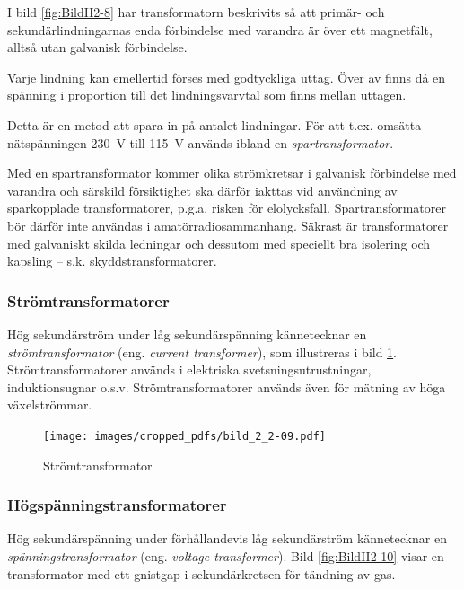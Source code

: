 I bild \ref{fig:BildII2-8} har transformatorn beskrivits så att primär- och
sekundärlindningarnas enda förbindelse med varandra är över ett magnetfält,
alltså utan galvanisk förbindelse.

Varje lindning kan emellertid förses med godtyckliga uttag. Över av finns då en
spänning i proportion till det lindningsvarvtal som finns mellan uttagen.

Detta är en metod att spara in på antalet lindningar. För att t.ex. omsätta
nätspänningen 230~V till 115~V används ibland en \emph{spartransformator}.

Med en spartransformator kommer olika strömkretsar i galvanisk förbindelse med
varandra och särskild försiktighet ska därför iakttas vid användning av
sparkopplade transformatorer, p.g.a. risken för elolycksfall.
Spartransformatorer bör därför inte användas i amatörradiosammanhang. Säkrast
är transformatorer med galvaniskt skilda ledningar och dessutom med speciellt
bra isolering och kapsling -- s.k. skyddstransformatorer.

\subsubsection{Strömtransformatorer}

Hög sekundärström under låg sekundärspänning kännetecknar en
\emph{strömtransformator} (eng. \emph{current transformer}),
som illustreras i bild \ref{fig:BildII2-9}.
Strömtransformatorer används i elektriska svetsningsutrustningar,
induktionsugnar o.s.v. Strömtransformatorer används även för mätning av höga
växelströmmar.

\begin{figure}[ht]
\begin{center}
\texttt{[image: images/cropped\_pdfs/bild\_2\_2-09.pdf]}
\caption{Strömtransformator}
\label{fig:BildII2-9}
\end{center}
\end{figure}

\subsubsection{Högspänningstransformatorer}

Hög sekundärspänning under förhållandevis låg sekundärström kännetecknar en
\emph{spänningstransformator} (eng. \emph{voltage transformer}).
Bild \ref{fig:BildII2-10} visar en transformator med ett gnistgap i
sekundärkretsen för tändning av gas.

